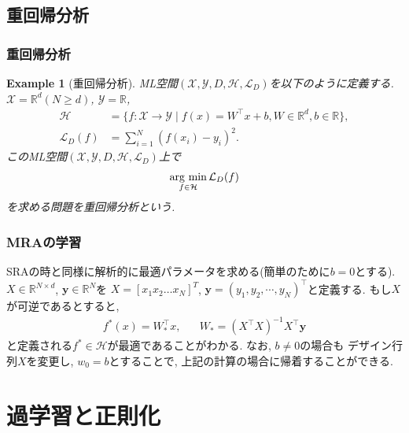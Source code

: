 \documentclass[dvipdfmx,11pt]{beamer}		%
\newtheorem{exam}[defi]{Example}
\newcommand{\R}{\mathbb{R}}
\newcommand{\X}{\mathcal{X}}
\newcommand{\Y}{\mathcal{Y}}
\newcommand{\Hil}{\mathcal{H}}
\newcommand{\Loss}{\mathcal{L}_{D}}
\newcommand{\MLsp}{(\X, \Y, D, \Hil, \Loss)}
\newcommand{\argmin}{\mathop{\rm arg~min}\limits}
\begin{document}
    \subsection{重回帰分析}
    \begin{frame}
        \frametitle{重回帰分析}
        \begin{exam}[重回帰分析]
            ML空間$\MLsp$を以下のように定義する.\\
            $\X = \R^d(N\geq d)$, $\Y = \R$, 
            \begin{align*}
                \Hil &= \{f:\X\to\Y\mid f(x) = W^{\top}x + b, W\in\R^{d}, b\in\R\},\\
                \Loss(f) &= \sum_{i = 1}^{N}(f(x_i) - y_i)^2.
            \end{align*}
            このML空間$\MLsp$上で
            \begin{align*}
                \argmin_{f\in\Hil}\Loss(f)
            \end{align*}
            を求める問題を重回帰分析という.
        \end{exam}
    \end{frame}
    \begin{frame}
        \frametitle{MRAの学習}
        SRAの時と同様に解析的に最適パラメータを求める(簡単のために$b = 0$とする). $X\in\R^{N\times d}$, $\mathbf{y}\in\R^N$を
        $X = [x_1 x_2 \ldots x_N]^{T}$, $\mathbf{y} = (y_{1}, y_{2}, \cdots, y_{N})^{\top}$と定義する. もし$X$が可逆であるとすると, 
        \begin{align*}
            f^{*}(x) = W_*^{\top}x, \hspace{20pt} W_* = (X^\top X)^{-1}X^\top\mathbf{y}
        \end{align*}
        と定義される$f^*\in\Hil$が最適であることがわかる. なお, $b\neq0$の場合も
        デザイン行列$X$を変更し, $w_{0} = b$とすることで, 上記の計算の場合に帰着することができる\cite{PFN}.
    \end{frame}
    \section{過学習と正則化}
\end{document}
